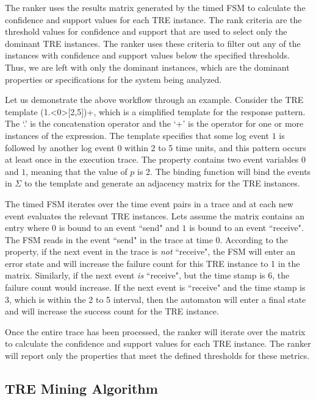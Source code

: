 \documentclass[]{sigplanconf}
\begin{document}
The ranker uses the results matrix generated by the timed FSM to calculate the confidence and support values for each TRE instance. The rank criteria are the threshold values for confidence and support that are used to select only the dominant TRE instances. The ranker uses these criteria to filter out any of the instances with confidence and support values below the specified thresholds. Thus, we are left with only the dominant instances, which are the dominant properties or specifications for the system being analyzed.


Let us demonstrate the above workflow through an example. Consider the TRE template (1.\textless0\textgreater[2,5])+, which is a simplified template for the response pattern. The `.' is the concatenation operator and the `+' is the operator for one or more instances of the expression.  The template specifies that some log event $1$ is followed by another log event $0$ within 2 to 5 time units, and this pattern occurs at least once in the execution trace. The property contains two event variables $0$ and $1$, meaning that the value of $p$ is 2. The binding function will bind the events in $\Sigma$ to the template and generate an adjacency matrix for the TRE instances.

The timed FSM iterates over the time event pairs in a trace and at each new event evaluates the relevant TRE instances. Lets assume the matrix contains an entry where $0$ is bound to an event ``send" and $1$ is bound to an event ``receive". The FSM reads in the event ``send" in the trace at time 0. According to the property, if the next event in the trace is \emph{not} ``receive", the FSM will enter an error state and will increase the failure count for this TRE instance to 1 in the matrix.
Similarly, if the next event \emph{is} ``receive", but the time stamp is 6, the failure count would increase.
If the next event is ``receive" and the time stamp is 3, which is within the 2 to 5 interval, then the automaton will enter a final state and will increase the success count for the TRE instance.

Once the entire trace has been processed, the ranker will iterate over the matrix to calculate the confidence and support values for each TRE instance. The ranker will report only the properties that meet the defined thresholds for these metrics.

\subsection{TRE Mining Algorithm}
\end{document}
